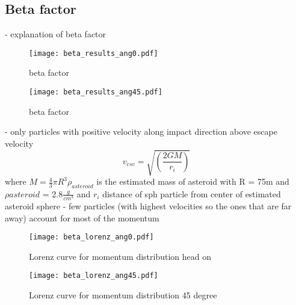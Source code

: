 \subsection{Beta factor}
- explanation of beta factor

\begin{figure}[H]
   \centering
   \texttt{[image: beta\_results\_ang0.pdf]}
   \caption{beta factor}
   \label{fig:beta_factor_0}
\end{figure}

\begin{figure}[H]
   \centering
   \texttt{[image: beta\_results\_ang45.pdf]}
   \caption{beta factor}
   \label{fig:beta_factor_45}
\end{figure}

- only particles with positive velocity along impact direction above escape velocity
\begin{equation}
   v_{esc} = \sqrt{\left(\dfrac{2GM}{r_i}\right)}
\end{equation}
where $M = \frac{4}{3}\pi R^3 \rho_{asteroid}$ is the estimated mass of asteroid with R = 75m and $\rho{asteroid}$ = 2.8$\frac{g}{cm^3}$ and $r_i$ distance of sph particle from center of estimated asteroid sphere
- few particles (with highest velocities so the ones that are far away) account for most of the momentum

\begin{figure}[H]
   \centering
   \texttt{[image: beta\_lorenz\_ang0.pdf]}
   \caption{Lorenz curve for momentum distribution head on}
   \label{fig:beta_factor_lorenz_0}
\end{figure}

\begin{figure}[H]
   \centering
   \texttt{[image: beta\_lorenz\_ang45.pdf]}
   \caption{Lorenz curve for momentum distribution 45 degree}
   \label{fig:beta_factor_lorenz_45}
\end{figure}